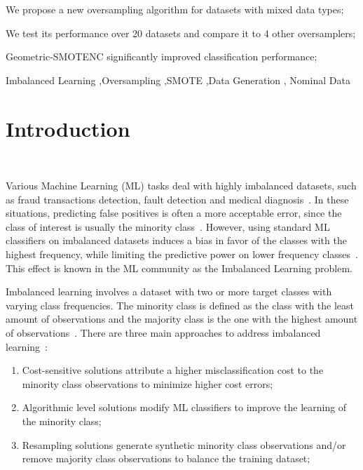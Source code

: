 \documentclass[preprint,12pt]{elsarticle}
\begin{document}
{\begin{frontmatter}
\begin{highlights}
    \item We propose a new oversampling algorithm for datasets with mixed data
        types;
    \item We test its performance over 20 datasets and compare it to 4 other
        oversamplers;
    \item Geometric-SMOTENC significantly improved classification performance;
\end{highlights}

\begin{keyword}
Imbalanced Learning \sep Oversampling \sep SMOTE \sep Data Generation \sep
Nominal Data
\end{keyword}

\end{frontmatter}

\linenumbers%

\section{Introduction}~\label{sec:introduction}

Various Machine Learning (ML) tasks deal with highly imbalanced datasets, such
as fraud transactions detection, fault detection and medical
diagnosis~\cite{tyagi2020sampling}. In these situations, predicting false
positives is often a more acceptable error, since the class of interest is
usually the minority class~\cite{vuttipittayamongkol2021class}. However, using
standard ML classifiers on imbalanced datasets induces a bias in favor of the
classes with the highest frequency, while limiting the predictive power on
lower frequency classes~\cite{lopez2013insight, das2018handling}. This effect
is known in the ML community as the Imbalanced Learning problem.

Imbalanced learning involves a dataset with two or more target classes with
varying class frequencies. The minority class is defined as the class with the
least amount of observations and the majority class is the one with the
highest amount of observations~\cite{kaur2019systematic}. There are three main
approaches to address imbalanced learning~\cite{fernandez2013analysing}: 

\begin{enumerate}
    \item Cost-sensitive solutions attribute a higher misclassification cost
        to the minority class observations to minimize higher cost errors;
    \item Algorithmic level solutions modify ML classifiers to improve the
        learning of the minority class;
    \item Resampling solutions generate synthetic minority class observations
        and/or remove majority class observations to balance the training
        dataset;
\end{enumerate}

}
\end{document}

